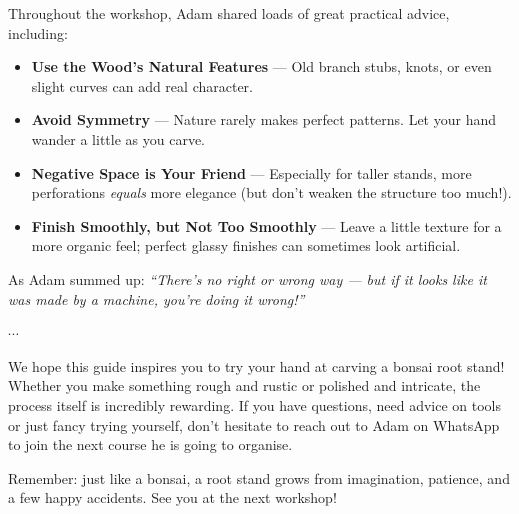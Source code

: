 \medskip
{}
\noindent
Throughout the workshop, Adam shared loads of great practical advice, including:

\begin{itemize}
    \item \textbf{Use the Wood's Natural Features} --- Old branch stubs, knots, or even slight curves can add real character.

    \item \textbf{Avoid Symmetry} --- Nature rarely makes perfect patterns. Let your hand wander a little as you carve.

    \item \textbf{Negative Space is Your Friend} --- Especially for taller stands, more perforations \textit{equals} more elegance (but don't weaken the structure too much!).

    \item \textbf{Finish Smoothly, but Not Too Smoothly} --- Leave a little texture for a more organic feel; perfect glassy finishes can sometimes look artificial.
\end{itemize}

As Adam summed up: \textit{``There's no right or wrong way --- but if it looks like it was made by a machine, you're doing it wrong!''}

\begin{center}
    $\cdots$
\end{center}

\noindent
We hope this guide inspires you to try your hand at carving a bonsai root stand! Whether you make something rough and rustic or polished and intricate, the process itself is incredibly rewarding.  
%
If you have questions, need advice on tools or just fancy trying yourself, don't hesitate to reach out to Adam on WhatsApp to join the next course he is going to organise.

Remember: just like a bonsai, a root stand grows from imagination, patience, and a few happy accidents. See you at the next workshop!

\closearticle
\columnbreak
